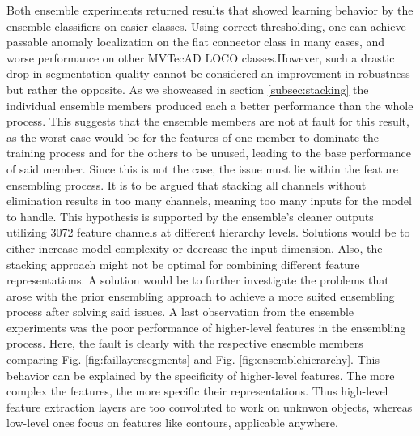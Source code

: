 Both ensemble experiments returned results that showed learning behavior by the ensemble classifiers on easier classes. Using correct thresholding, one can achieve passable 
anomaly localization on the flat connector class in many cases, and worse performance on other MVTecAD LOCO \cite{LOCODentsAndScratchesBergmann2022} classes.However, such a 
drastic drop in segmentation quality cannot be considered an improvement in robustness but rather the opposite. As we showcased in 
section \ref{subsec:stacking} the individual ensemble members produced each a better performance than the whole process. 
This suggests that the ensemble members are not at fault for this result, as the worst case would be for the features of one member to dominate the training process 
and for the others to be unused, leading to the base performance of said member. Since this is not the case, the issue must lie within the feature ensembling process. 
It is to be argued that stacking all channels without elimination results in too many channels, meaning too many inputs for the model to handle. This hypothesis is 
supported by the ensemble's cleaner outputs utilizing 3072 feature channels at different hierarchy levels. Solutions would be to either 
increase model complexity or decrease the input dimension. Also, the stacking approach might not be optimal for combining different feature representations. 
A solution would be to further investigate the problems that arose with the prior ensembling approach to achieve a more suited ensembling process after solving said 
issues. \newline 
A last observation from the ensemble experiments was the poor performance of higher-level features in the ensembling process. 
Here, the fault is clearly with the respective ensemble members comparing Fig. \ref{fig:faillayersegments} and Fig. \ref{fig:ensemblehierarchy}. This behavior can be explained 
by the specificity of higher-level features. The more complex the features, the more specific their representations. Thus high-level feature extraction layers are too 
convoluted to work on unknwon objects, whereas low-level ones focus on features like contours, applicable anywhere. \newline 



